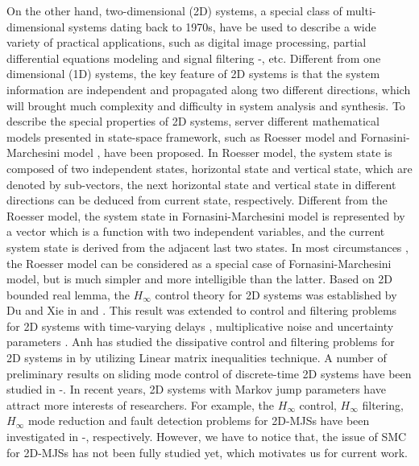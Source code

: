 \documentclass[conference]{IEEEtran}
\begin{document}
	On the other hand, two-dimensional (2D) systems, a special class of multi-dimensional systems  dating back to 1970s,  have be used to describe a wide variety of practical applications, such as digital image processing, partial differential equations modeling and signal filtering \cite{roesser}-\cite{signal-processing}, etc. Different from one dimensional (1D) systems, the key feature of  2D systems is that the system information are independent and propagated along two different directions, which will brought much complexity and difficulty in system analysis and synthesis. To describe the special properties of 2D systems, server different mathematical models presented in state-space framework, such as Roesser model \cite{roesser} and Fornasini-Marchesini model \cite{FM-model}, have been proposed. In Roesser model, the system state is composed of two independent states, horizontal state and vertical state, which are denoted by  sub-vectors, the next horizontal state and vertical state in different directions can be deduced from current state, respectively. Different from the Roesser model, the system state in Fornasini-Marchesini model is represented by a vector which is a function with two independent variables, and the current system state is derived from the adjacent last two states. In most circumstances , the Roesser model can be considered as a special case of Fornasini-Marchesini model, but is much simpler and more intelligible than the latter. Based on 2D bounded real lemma, the $H_{\infty}$ control theory for 2D systems was established by Du and Xie in \cite{du-chunling&l-xie} and \cite{Du-Xie}. This result was extended to control and filtering problems for 2D systems with time-varying delays \cite{tile-varing-delay},  multiplicative noise \cite{Ahn-noise} and uncertainty parameters \cite{Uncertainty-parmeters2D}. 
	Anh has studied  the dissipative control and filtering problems for 2D systems in \cite{Ahn-2}  by utilizing Linear matrix inequalities technique.
	A number of preliminary results on sliding mode control of discrete-time 2D systems have been studied in \cite{SMC2D1}-\cite{SMC2D3}.
	In recent years, 2D systems with Markov jump parameters have attract more interests of researchers. For example,  the $H_{\infty}$ control, $H_{\infty}$ filtering, $H_{\infty}$ mode reduction and fault detection problems for 2D-MJSs have been investigated in \cite{Markov-Gao}-\cite{fault-dectction-shenying}, respectively. However, we have to notice that, the issue of SMC  for 2D-MJSs has not been fully studied yet, which motivates us for current work.
	 
\end{document}
